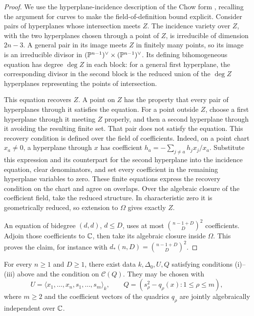 \begin{proof}
We use the hyperplane-incidence description of the Chow form
\cite[Section~1, Proposition~1.1]{Guerra96}, recalling the argument for
curves to make the field-of-definition bound explicit.
Consider pairs of hyperplanes whose intersection meets \(Z\).
The incidence variety over \(Z\), with the two hyperplanes chosen
through a point of \(Z\), is irreducible of dimension \(2n-3\).
A general pair in its image meets \(Z\) in finitely many points,
so its image is an irreducible divisor in
\((\mathbb P^{n-1})^\vee\times(\mathbb P^{n-1})^\vee\).
Its defining bihomogeneous equation has degree \(\deg Z\) in each
block: for a general first hyperplane, the corresponding divisor
in the second block is the reduced union of the \(\deg Z\)
hyperplanes representing the points of intersection.

This equation recovers \(Z\). A point on \(Z\) has the property that
every pair of hyperplanes through it satisfies the equation.
For a point outside \(Z\), choose a first hyperplane through it
meeting \(Z\) properly, and then a second hyperplane through it
avoiding the resulting finite set. That pair does not satisfy the
equation. This recovery condition is defined over the field of coefficients.
Indeed, on a point chart \(x_a\ne0\), a hyperplane through \(x\) has
coefficient \(h_a=-\sum_{j\ne a}h_jx_j/x_a\). Substitute this expression
and its counterpart for the second hyperplane into the incidence
equation, clear denominators, and set every coefficient in the remaining
hyperplane variables to zero. These finite equations express the recovery
condition on the chart and agree on overlaps. Over the algebraic closure
of the coefficient field, take the reduced structure. In characteristic
zero it is geometrically reduced, so extension to \(\Omega\) gives
exactly \(Z\).

An equation of bidegree \((d,d)\), \(d\le D\), uses at most
\(\binom{n-1+D}{D}^2\) coefficients. Adjoin those coefficients to
\(\mathbb C\), then take its algebraic closure inside \(\Omega\).
This proves the claim, for instance with
\(d_*(n,D)=\binom{n-1+D}{D}^2\).
\end{proof}

\begin{proposition}\label{prop:initial-data}
For every \(n\ge1\) and \(D\ge1\), there exist data
\(k,\Delta_0,U,Q\) satisfying conditions \textup{(i)}--\textup{(iii)}
above and the condition on \(\mathcal C(Q)\).
They may be chosen with
\[
 U=\langle x_1,\ldots,x_n,s_1,\ldots,s_m\rangle_k,
 \qquad
 Q=(s_\rho^2-q_\rho(x):1\le\rho\le m),
\]
where \(m\ge2\) and the coefficient vectors of the quadrics \(q_\rho\)
are jointly algebraically independent over \(\mathbb C\).
\end{proposition}

